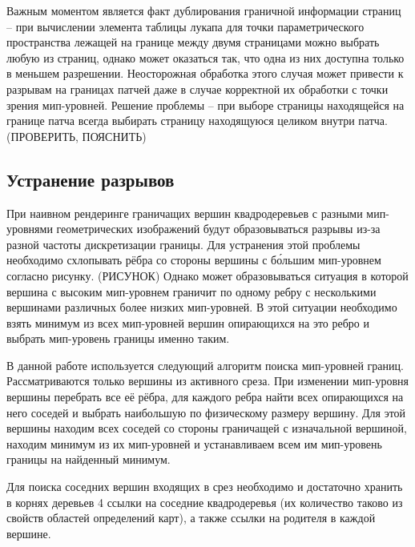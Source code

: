 \documentclass{article}
\begin{document}
Важным моментом является факт дублирования граничной информации страниц -- при вычислении элемента таблицы лукапа для точки параметрического пространства лежащей на границе между двумя страницами можно выбрать любую из страниц, однако может оказаться так, что одна из них доступна только в меньшем разрешении. Неосторожная обработка этого случая может привести к разрывам на границах патчей даже в случае корректной их обработки с точки зрения мип-уровней. Решение проблемы -- при выборе страницы находящейся на границе патча всегда выбирать страницу находящуюся целиком внутри патча. (ПРОВЕРИТЬ, ПОЯСНИТЬ)

\subsection{Устранение разрывов}
При наивном рендеринге граничащих вершин квадродеревьев с разными мип-уровнями геометрических изображений будут образовываться разрывы из-за разной частоты дискретизации границы. Для устранения этой проблемы необходимо схлопывать рёбра со стороны вершины с б\'ольшим мип-уровнем согласно рисунку. (РИСУНОК) Однако может образовываться ситуация в которой вершина с высоким мип-уровнем граничит по одному ребру с несколькими вершинами различных более низких мип-уровней. В этой ситуации необходимо взять минимум из всех мип-уровней вершин опирающихся на это ребро и выбрать мип-уровень границы именно таким.

В данной работе используется следующий алгоритм поиска мип-уровней границ. Рассматриваются только вершины из активного среза. При изменении мип-уровня вершины перебрать все её рёбра, для каждого ребра найти всех опирающихся на него соседей и выбрать наибольшую по физическому размеру вершину. Для этой вершины находим всех соседей со стороны граничащей с изначальной вершиной, находим минимум из их мип-уровней и устанавливаем всем им мип-уровень границы на найденный минимум.

Для поиска соседних вершин входящих в срез необходимо и достаточно хранить в корнях деревьев 4 ссылки на соседние квадродеревья (их количество таково из свойств областей определений карт), а также ссылки на родителя в каждой вершине.
\end{document}
